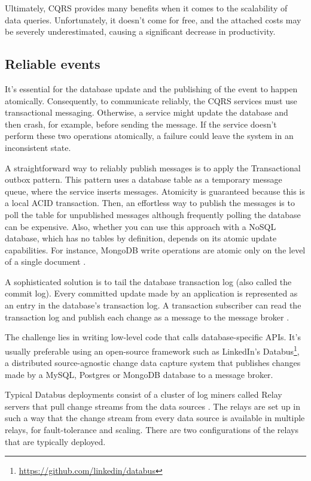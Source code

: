 \documentclass[conference]{IEEEtran}
\begin{document}
Ultimately, CQRS provides many benefits when it comes to the scalability of data queries. Unfortunately, it doesn't come for free, and the attached costs may be severely underestimated, causing a significant decrease in productivity.

\subsection{Reliable events}

It's essential for the database update and the publishing of the event to happen atomically. Consequently, to communicate reliably, the CQRS services must use transactional messaging. Otherwise, a service might update the database and then crash, for example, before sending the message. If the service doesn't perform these two operations atomically, a failure could leave the system in an inconsistent state.

A straightforward way to reliably publish messages is to apply the Transactional outbox pattern. This pattern uses a database table as a temporary message queue, where the service inserts messages. Atomicity is guaranteed because this is a local ACID transaction. Then, an effortless way to publish the messages is to poll the table for unpublished messages although frequently polling the database can be expensive. Also, whether you can use this approach with a NoSQL database, which has no tables by definition, depends on its atomic update capabilities. For instance, MongoDB write operations are atomic only on the level of a single document \cite{mongodb-atomic-write}.

A sophisticated solution is to tail the database transaction log (also called the commit log). Every committed update made by an application is represented as an entry in the database's transaction log. A transaction subscriber can read the transaction log and publish each change as a message to the message broker \cite{log-tailing}.

The challenge lies in writing low-level code that calls database-specific APIs. It's usually preferable using an open-source framework such as LinkedIn's Databus\footnote{\url{https://github.com/linkedin/databus}}, a distributed source-agnostic change data capture system that publishes changes made by a MySQL, Postgres or MongoDB database to a message broker.

Typical Databus deployments consist of a cluster of log miners called Relay servers that pull change streams from the data sources \cite{databus}. The relays are set up in such a way that the change stream from every data source is available in multiple relays, for fault-tolerance and scaling. There are two configurations of the relays that are typically deployed.
\end{document}

